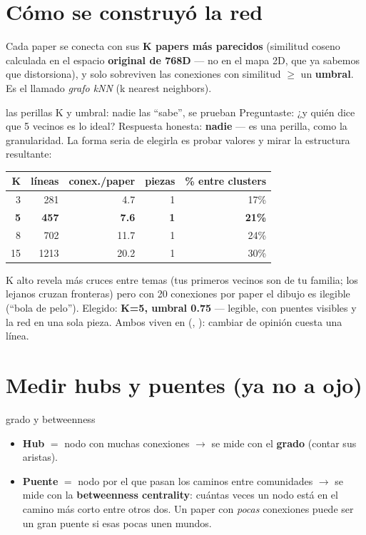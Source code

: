 \documentclass[11pt,a4paper]{article}
\begin{document}

\section{Cómo se construyó la red}

Cada paper se conecta con sus \textbf{K papers más parecidos} (similitud coseno calculada en
el espacio \textbf{original de 768D} — no en el mapa 2D, que ya sabemos que distorsiona), y
solo sobreviven las conexiones con similitud $\geq$ un \textbf{umbral}. Es el llamado
\emph{grafo kNN} (k nearest neighbors).

\begin{concepto}{las perillas K y umbral: nadie las ``sabe'', se prueban}
Preguntaste: ¿y quién dice que 5 vecinos es lo ideal? Respuesta honesta: \textbf{nadie} — es
una perilla, como la granularidad. La forma seria de elegirla es probar valores y mirar la
estructura resultante:

\begin{center}
\begin{tabular}{rrrrr}
\textbf{K} & \textbf{líneas} & \textbf{conex./paper} & \textbf{piezas} & \textbf{\% entre clusters} \\
\hline
3 & 281 & 4.7 & 1 & 17\% \\
\textbf{5} & \textbf{457} & \textbf{7.6} & \textbf{1} & \textbf{21\%} \\
8 & 702 & 11.7 & 1 & 24\% \\
15 & 1213 & 20.2 & 1 & 30\% \\
\end{tabular}
\end{center}

K alto revela más cruces entre temas (tus primeros vecinos son de tu familia; los lejanos
cruzan fronteras) pero con 20 conexiones por paper el dibujo es ilegible (``bola de pelo'').
Elegido: \textbf{K=5, umbral 0.75} — legible, con puentes visibles y la red en una sola
pieza. Ambos viven en  (,
): cambiar de opinión cuesta una línea.
\end{concepto}

\section{Medir hubs y puentes (ya no a ojo)}

\begin{concepto}{grado y betweenness}
\begin{itemize}
  \item \textbf{Hub} $=$ nodo con muchas conexiones $\rightarrow$ se mide con el
        \textbf{grado} (contar sus aristas).
  \item \textbf{Puente} $=$ nodo por el que pasan los caminos entre comunidades $\rightarrow$
        se mide con la \textbf{betweenness centrality}: cuántas veces un nodo está en el
        camino más corto entre otros dos. Un paper con \emph{pocas} conexiones puede ser un
        gran puente si esas pocas unen mundos.
\end{itemize}
\end{concepto}
\end{document}

